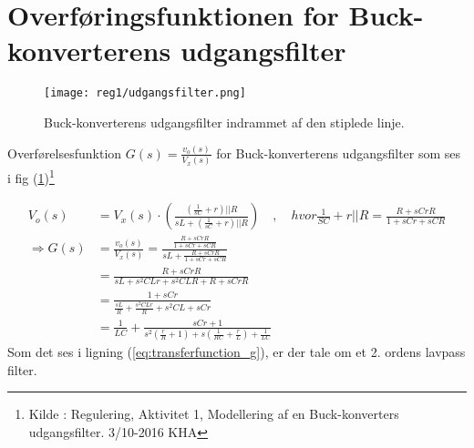 \section{Overføringsfunktionen for Buck-konverterens udgangsfilter}\label{sec:spm1}
\begin{figure}[h!]
	\centering
	\texttt{[image: reg1/udgangsfilter.png]}
	\caption{Buck-konverterens udgangsfilter indrammet af den stiplede linje.}
	\label{fig:udgangsfilter}
\end{figure}
\FloatBlock

Overførelsesfunktion $G(s) = \frac{v_o(s)}{V_x(s)}$ for Buck-konverterens udgangsfilter som ses i fig (\ref{fig:udgangsfilter})\footnote{Kilde : Regulering, Aktivitet 1, Modellering af en Buck-konverters udgangsfilter. 3/10-2016 KHA}

\begin{align}
V_o(s) &= V_x(s) \cdot \left( \frac{\left(\frac{1}{sC} + r \right) || R }{sL + \left(\frac{1}{sC} + r \right) || R}  \right) 
\quad, \quad hvor \frac{1}{SC} + r || R = \frac{R+sCrR}{1+sCr+sCR} \\
\Rightarrow G(s) &= \frac{v_o(s)}{V_x(s)} = \frac{ \frac{R+sCrR}{1+sCr+sCR}}{sL +  \frac{R+sCrR}{1+sCr+sCR}} \\
&= \frac{R+sCrR}{sL+s^2CLr+s^2CLR+R+sCrR}\\
&= \frac{1+sCr}{\frac{sL}{R}+\frac{s^2CLr}{R}+s^2CL+sCr}\\
&= \frac{1}{LC} + \frac{sCr+1}{s^2\left(\frac{r}{R}+1\right)+s\left(\frac{1}{RC}+\frac{r}{L}\right)+\frac{1}{LC}} \label{eq:transferfunction_g}
\end{align}
Som det ses i ligning (\ref{eq:transferfunction_g}), er der tale om et 2. ordens lavpass filter.
\newpage